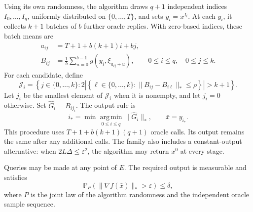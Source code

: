 \documentclass[10pt]{article}
\theoremstyle{definition}
\begin{document}
Using its own randomness, the algorithm draws $q+1$ independent indices $I_0,\ldots,I_q$, uniformly distributed on $\{0,\ldots,T\}$, and sets $y_i=x^{I_i}$. At each $y_i$, it collects $k+1$ batches of $b$ further oracle replies. With zero-based indices, these batch means are
\[
\begin{aligned}
a_{ij}&=T+1+b(k+1)i+bj,\\
B_{ij}&=\frac{1}{b}\sum_{u=0}^{b-1}
 g(y_i,\xi_{a_{ij}+u}),
\qquad 0\leq i\leq q,\quad 0\leq j\leq k.
\end{aligned}
\]
For each candidate, define
\[
\mathcal{J}_i
=\left\{j\in\{0,\ldots,k\}:
2\left|\left\{\ell\in\{0,\ldots,k\}:
\|B_{ij}-B_{i\ell}\|_*\leq\rho
\right\}\right|>k+1\right\}.
\]
Let $j_i$ be the smallest element of $\mathcal{J}_i$ when it is nonempty, and let $j_i=0$ otherwise. Set $\widehat G_i=B_{i j_i}$. The output rule is
\[
i_* = \min\operatorname*{arg\,min}_{0\leq i\leq q}
\|\widehat G_i\|_*,
\qquad \bar{x}=y_{i_*}.
\]
This procedure uses $T+1+b(k+1)(q+1)$ oracle calls. Its output remains the same after any additional calls. The family also includes a constant-output alternative: when $2L\Delta\leq\varepsilon^2$, the algorithm may return $x^0$ at every stage.

Queries may be made at any point of $E$. The required output is measurable and satisfies
\[
\mathbb{P}_{P}\!\left(\|\nabla f(\bar{x})\|_*>\varepsilon\right)
\leq\delta,
\]
where $P$ is the joint law of the algorithm randomness and the independent oracle sample sequence.
\end{document}
